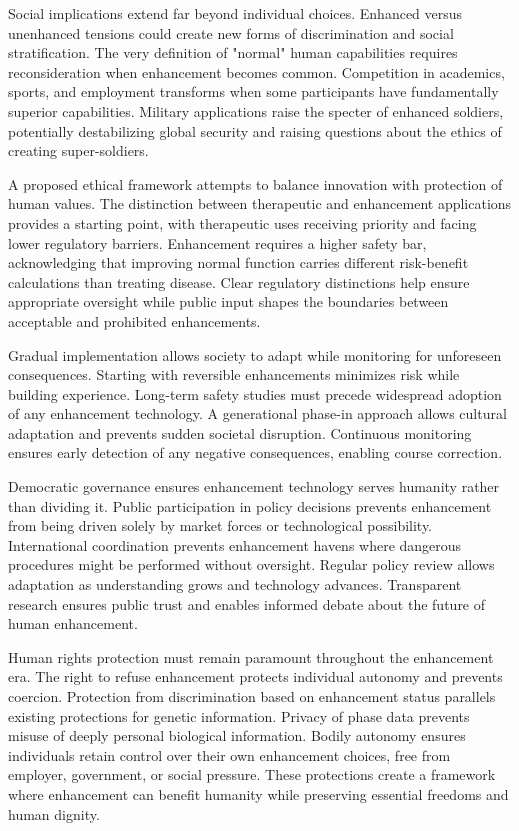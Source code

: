 \documentclass[12pt,a4paper]{report}
\begin{document}
Social implications extend far beyond individual choices. Enhanced versus unenhanced tensions could create new forms of discrimination and social stratification. The very definition of "normal" human capabilities requires reconsideration when enhancement becomes common. Competition in academics, sports, and employment transforms when some participants have fundamentally superior capabilities. Military applications raise the specter of enhanced soldiers, potentially destabilizing global security and raising questions about the ethics of creating super-soldiers.

A proposed ethical framework attempts to balance innovation with protection of human values. The distinction between therapeutic and enhancement applications provides a starting point, with therapeutic uses receiving priority and facing lower regulatory barriers. Enhancement requires a higher safety bar, acknowledging that improving normal function carries different risk-benefit calculations than treating disease. Clear regulatory distinctions help ensure appropriate oversight while public input shapes the boundaries between acceptable and prohibited enhancements.

Gradual implementation allows society to adapt while monitoring for unforeseen consequences. Starting with reversible enhancements minimizes risk while building experience. Long-term safety studies must precede widespread adoption of any enhancement technology. A generational phase-in approach allows cultural adaptation and prevents sudden societal disruption. Continuous monitoring ensures early detection of any negative consequences, enabling course correction.

Democratic governance ensures enhancement technology serves humanity rather than dividing it. Public participation in policy decisions prevents enhancement from being driven solely by market forces or technological possibility. International coordination prevents enhancement havens where dangerous procedures might be performed without oversight. Regular policy review allows adaptation as understanding grows and technology advances. Transparent research ensures public trust and enables informed debate about the future of human enhancement.

Human rights protection must remain paramount throughout the enhancement era. The right to refuse enhancement protects individual autonomy and prevents coercion. Protection from discrimination based on enhancement status parallels existing protections for genetic information. Privacy of phase data prevents misuse of deeply personal biological information. Bodily autonomy ensures individuals retain control over their own enhancement choices, free from employer, government, or social pressure. These protections create a framework where enhancement can benefit humanity while preserving essential freedoms and human dignity.
\end{document}

